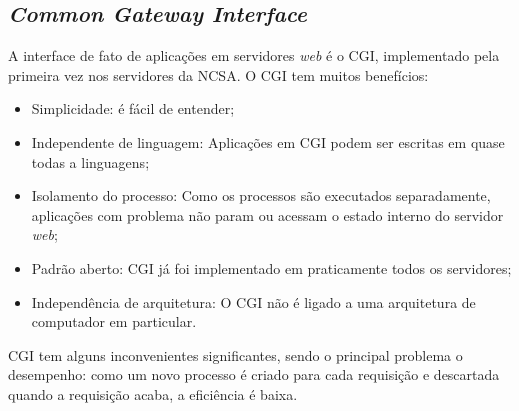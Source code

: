 \subsection{\textit{Common Gateway Interface}}
A interface de fato de aplicações em servidores \textit{web} é o CGI, 
implementado pela primeira vez nos servidores da NCSA. O CGI tem muitos 
benefícios:
\begin{itemize}
	\item Simplicidade: é fácil de entender;
	\item Independente de linguagem: Aplicações em CGI podem ser escritas em quase todas a linguagens;
	\item Isolamento do processo: Como os processos são executados 
	separadamente, aplicações com problema não param ou acessam o estado 
	interno do servidor \textit{web};
	\item Padrão aberto: CGI já foi implementado em praticamente todos os 
	servidores;
	\item Independência de arquitetura: O CGI não é ligado a uma arquitetura de computador em particular.
\end{itemize}
CGI tem alguns inconvenientes significantes, sendo o principal problema  o 
desempenho: como um novo processo é criado para cada requisição e descartada 
quando a requisição acaba, a eficiência é baixa.
